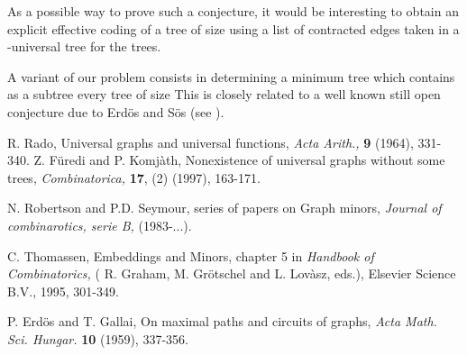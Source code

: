 \documentclass{llncs}
\begin{document}
As a possible way to prove such a conjecture, it would be
interesting to obtain an explicit effective coding of a tree of
size  using a list of contracted edges taken in a -universal
tree for the trees.

A variant of our problem consists in determining a minimum tree
which contains as a sub{\-}tree every tree of size  This is
closely related to a well known still open conjecture due to
Erd\"{o}s and S\"{o}s (see \cite{ES}).




\begin{thebibliography}{9}
 R. Rado, Universal graphs and universal functions, \textit{Acta Arith.,} \textbf{9} (1964),
331-340.
 Z. F\"{u}redi and P. Komj\`{a}th, Nonexistence of universal graphs
without some trees, \textit{Combinatorica, }\textbf{17}, (2)
(1997), 163-171.

 N. Robertson and P.D. Seymour, series of papers on Graph
minors, \textit{Journal of combinarotics, serie B, }(1983-...).

 C. Thomassen, Embeddings and Minors, chapter 5 in \textit{Handbook of Combinatorics, }( R. Graham, M.
Gr\"{o}tschel and L. Lov\`{a}sz, eds.), Elsevier Science B.V., 1995,
301-349.

 P. Erd\"{o}s and T. Gallai, On maximal paths and circuits of graphs,
\textit{Acta Math. Sci. Hungar. }\textbf{10} (1959), 337-356.
\end{thebibliography}
\end{document}
